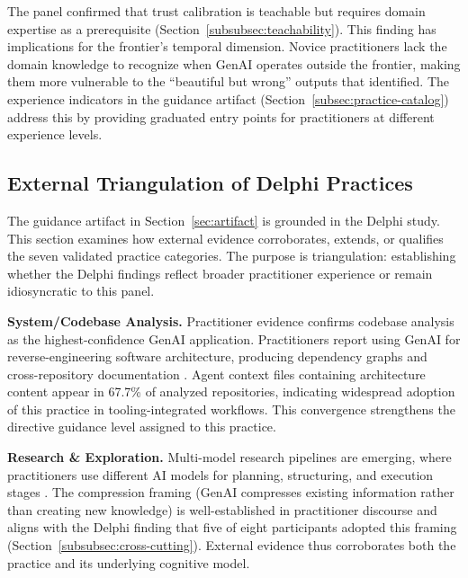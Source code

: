 The panel confirmed that trust calibration is teachable but requires domain
expertise as a prerequisite (Section~\ref{subsubsec:teachability}). This
finding has implications for the frontier's temporal dimension. Novice
practitioners lack the domain knowledge to recognize when GenAI operates
outside the frontier, making them more vulnerable to the ``beautiful but wrong''
outputs that \textcite{dellacqua_navigating_2023} identified. The experience
indicators in the guidance artifact (Section~\ref{subsec:practice-catalog})
address this by providing graduated entry points for practitioners at different
experience levels.

\subsection{External Triangulation of Delphi Practices}\label{subsec:disc-triangulation}

The guidance artifact in Section~\ref{sec:artifact} is grounded in the Delphi
study. This section examines how external evidence corroborates, extends, or
qualifies the seven validated practice categories. The purpose is triangulation:
establishing whether the Delphi findings reflect broader practitioner experience
or remain idiosyncratic to this panel.

\textbf{System/Codebase Analysis.} Practitioner evidence confirms codebase
analysis as the highest-confidence GenAI application. Practitioners report using
GenAI for reverse-engineering software architecture, producing dependency graphs
and cross-repository documentation
\parencite{chatlatanagulchai_agent_readmes_2025}. Agent context files containing
architecture content appear in 67.7\% of analyzed repositories, indicating
widespread adoption of this practice in tooling-integrated workflows. This
convergence strengthens the directive guidance level assigned to this practice.

\textbf{Research \& Exploration.} Multi-model research pipelines are emerging,
where practitioners use different AI models for planning, structuring, and
execution stages \parencite{banh_affordance_genai_ea_2025}. The compression
framing (GenAI compresses existing information rather than creating new
knowledge) is well-established in practitioner discourse and aligns with the
Delphi finding that five of eight participants adopted this framing
(Section~\ref{subsubsec:cross-cutting}). External evidence thus corroborates
both the practice and its underlying cognitive model.

